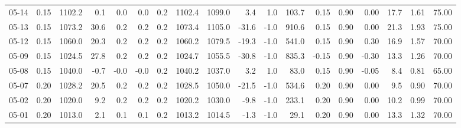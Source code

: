 \begin{threeparttable}
{\begin{tabular}{lrrrrrrrrrrrrrrrrr}
  05-14 &     0.15 & 1102.2 &               0.1 &               0.0 &                0.0 &                0.2 & 1102.4 & 1099.0 &        3.4 &                      1.0 &               103.7 &       0.15 &      0.90 &           0.00 &             17.7 &            1.61 &                  75.00 \\
  05-13 &     0.15 & 1073.2 &              30.6 &               0.2 &                0.2 &                0.2 & 1073.4 & 1105.0 &      -31.6 &                     -1.0 &               910.6 &       0.15 &      0.90 &           0.00 &             21.3 &            1.93 &                  75.00 \\
  05-12 &     0.15 & 1060.0 &              20.3 &               0.2 &                0.2 &                0.2 & 1060.2 & 1079.5 &      -19.3 &                     -1.0 &               541.0 &       0.15 &      0.90 &           0.30 &             16.9 &            1.57 &                  70.00 \\
  05-09 &     0.15 & 1024.5 &              27.8 &               0.2 &                0.2 &                0.2 & 1024.7 & 1055.5 &      -30.8 &                     -1.0 &               835.3 &      -0.15 &      0.90 &          -0.30 &             13.3 &            1.26 &                  70.00 \\
  05-08 &     0.15 & 1040.0 &              -0.7 &              -0.0 &               -0.0 &                0.2 & 1040.2 & 1037.0 &        3.2 &                      1.0 &                83.0 &       0.15 &      0.90 &          -0.05 &              8.4 &            0.81 &                  65.00 \\
  05-07 &     0.20 & 1028.2 &              20.5 &               0.2 &                0.2 &                0.2 & 1028.5 & 1050.0 &      -21.5 &                     -1.0 &               534.6 &       0.20 &      0.90 &           0.00 &              9.5 &            0.90 &                  70.00 \\
  05-02 &     0.20 & 1020.0 &               9.2 &               0.2 &                0.2 &                0.2 & 1020.2 & 1030.0 &       -9.8 &                     -1.0 &               233.1 &       0.20 &      0.90 &           0.00 &             10.2 &            0.99 &                  70.00 \\
  05-01 &     0.20 & 1013.0 &               2.1 &               0.1 &                0.1 &                0.2 & 1013.2 & 1014.5 &       -1.3 &                     -1.0 &                29.1 &       0.20 &      0.90 &           0.00 &             13.3 &            1.32 &                  70.00 \\

\end{tabular}}
\end{threeparttable}
